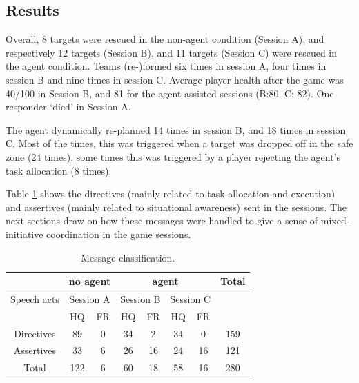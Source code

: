 \subsection{Results}
Overall, 8 targets were rescued in the non-agent condition (Session A), and respectively 12 targets (Session B), and 11 targets (Session C) were rescued in the agent condition. Teams (re-)formed six times in session A, four times in session B and nine times  in session C. Average player health after the game was 40/100 in Session B, and 81 for the agent-assisted sessions (B:80, C: 82). One responder `died' in Session A.  

The agent dynamically re-planned 14 times in session B, and 18 times in session C. Most of the times, this was triggered when a target was dropped off in the safe zone (24 times), some times this was triggered by a player rejecting the agent's task allocation (8 times). 

Table \ref{tab:msgs} shows the directives (mainly related to task allocation and execution) and assertives (mainly related to situational awareness) sent in the sessions. The next sections draw on how these messages were handled to give a sense of mixed-initiative coordination in the game sessions.

\begin{table}\footnotesize
\begin{tabular}{c | c c | c c c c | c}
 & \multicolumn{2}{c|}{no agent} &  \multicolumn{4}{c|}{agent} & Total \\
 \hline
 Speech acts & \multicolumn{2}{c|}{Session A} & \multicolumn{2}{c}{Session B} & \multicolumn{2}{c|}{Session C} & \\
  & HQ & FR & HQ & FR & HQ & FR & \\
  \hline
  Directives & 89 & 0 & 34 & 2 & 34 & 0 & 159 \\
  Assertives & 33 & 6 & 26 & 16 & 24 & 16 & 121 \\
  \hline
  Total & 122 & 6 & 60 & 18 & 58 & 16 & 280 \\
\end{tabular}
 \label{tab:msgs}
 \caption{Message classification.}
\end{table}


